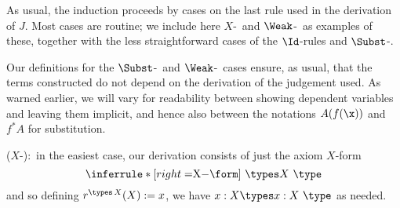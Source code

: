 As usual, the induction proceeds by cases on the last rule used in the derivation of $J$.  Most cases are routine; we include here $X$-\form\ and $\Weak$-\sctype\ as examples of these, together with the less straightforward cases of the $\Id$-rules and $\Subst$-\sctype .

Our definitions for the $\Subst$-\sctype\ and $\Weak$-\sctype\ cases ensure, as usual, that the terms constructed do not depend on the derivation of the judgement used.  As warned earlier, we will vary for readability between showing dependent variables and leaving them implicit, and hence also between the notations $A(f(\x))$ and $f^*A$ for substitution.\medskip

% 
% 

\noindent($X$-\form):\ in the easiest case, our derivation consists of just the axiom $X$-form
\[\inferrule*[right=$X$-\form]{\ }{ \types X\ \type}\]
and so defining $r^{\types\,X}(X) := x$, we have $x:X \types x: X\ \type$ as needed. \miniqed

